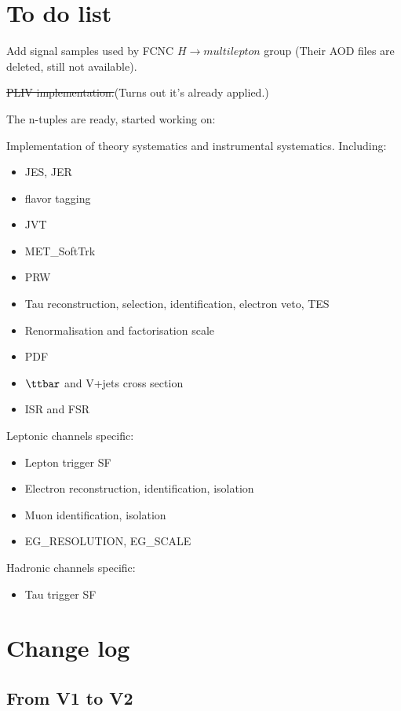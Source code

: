 \section{To do list}

Add signal samples used by FCNC $H\to multilepton$ group (Their AOD files are deleted, still not available).

\sout{PLIV implementation.}(Turns out it's already applied.)

The n-tuples are ready, started working on:

Implementation of theory systematics and instrumental systematics. Including:

\begin{itemize}
	\item JES, JER
	\item flavor tagging
	\item JVT
	\item MET\_SoftTrk
	\item PRW
	\item Tau reconstruction, selection, identification, electron veto, TES
	\item Renormalisation and factorisation scale
	\item PDF
	\item $\ttbar$ and V+jets cross section
	\item ISR and FSR
\end{itemize}

Leptonic channels specific:
\begin{itemize}
	\item Lepton trigger SF
	\item Electron reconstruction, identification, isolation
	\item Muon identification, isolation
	\item EG\_RESOLUTION, EG\_SCALE
\end{itemize}

Hadronic channels specific:
\begin{itemize}
	\item Tau trigger SF
\end{itemize}

\section{Change log}

\subsection{From V1 to V2}

